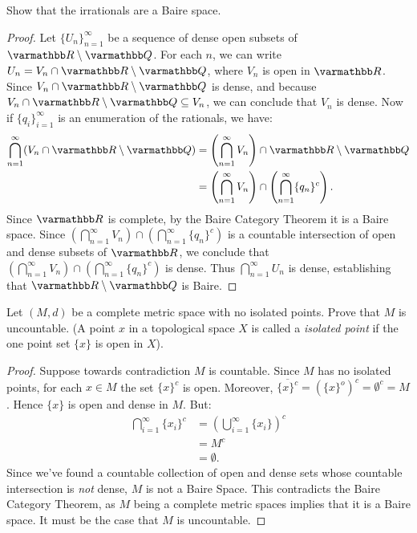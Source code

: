 \documentclass[10pt,twoside,openany]{memoir}
\begin{document}
\begin{problem}
Show that the irrationals are a Baire space.
\end{problem}
    \begin{proof}
        Let $\{U_n\}_{n = 1}^\infty$ be a sequence of dense open subsets of $\bfR \setminus \bfQ$. For each $n$, we can write $U_n = V_n \cap \bfR \setminus \bfQ$, where $V_n$ is open in $\bfR$. Since $V_n \cap \bfR \setminus \bfQ$ is dense, and because $V_n \cap \bfR \setminus \bfQ \subseteq V_n$, we can conclude that $V_n$ is dense. Now if $\{q_i\}_{i = 1}^\infty$ is an enumeration of the rationals, we have:
            \begin{equation*}
            \begin{split}
                \bigcap_{n = 1}^\infty (V_n \cap \bfR\setminus\bfQ)
                & = \left( \bigcap_{n = 1}^\infty V_n \right) \cap \bfR \setminus \bfQ \\
                & = \left( \bigcap_{n = 1}^\infty V_n \right) \cap \left( \bigcap_{n = 1}^\infty \{q_n\}^c \right).
            \end{split}
            \end{equation*}
        Since $\bfR$ is complete, by the Baire Category Theorem it is a Baire space. Since $\left( \bigcap_{n = 1}^\infty V_n \right) \cap \left( \bigcap_{n = 1}^\infty \{q_n\}^c \right)$ is a countable intersection of open and dense subsets of $\bfR$, we conclude that $\left( \bigcap_{n = 1}^\infty V_n \right) \cap \left( \bigcap_{n = 1}^\infty \{q_n\}^c \right)$ is dense. Thus $\bigcap_{n = 1}^\infty U_n$ is dense, establishing that $\bfR\setminus \bfQ$ is Baire.
    \end{proof}

\newpage
\begin{problem}[manual-num={1}]
Let $(M,d)$ be a complete metric space with no isolated points. Prove that $M$ is uncountable. (A point $x$ in a topological space $X$ is called a \textit{isolated point} if the one point set $\{x\}$ is open in $X$).
\end{problem}
    \begin{proof}
        Suppose towards contradiction $M$ is countable. Since $M$ has no isolated points, for each $x \in M$ the set $\{x\}^c$ is open. Moreover, $\overline{\{x\}^c} = ( \{x\}^o)^c = \emptyset^c = M$. Hence $\{x\}$ is open and dense in $M$. But:
            \begin{equation*}
            \begin{split}
                \bigcap_{i = 1}^\infty \{x_i\}^c 
                & = \left( \bigcup_{i = 1}^\infty \{x_i\} \right)^c \\
                & = M^c \\
                & = \emptyset.
            \end{split}
            \end{equation*}
        Since we've found a countable collection of open and dense sets whose countable intersection is \textit{not} dense, $M$ is not a Baire Space. This contradicts the Baire Category Theorem, as $M$ being a complete metric spaces implies that it is a Baire space. It must be the case that $M$ is uncountable.
    \end{proof}
\end{document}
